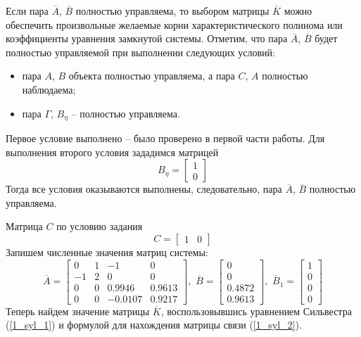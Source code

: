 Если пара $\overline{A}$, $\overline{B}$ полностью управляема, то выбором матрицы $\overline{K}$ можно обеспечить произвольные желаемые корни характеристического полинома или коэффициенты уравнения замкнутой системы. Отметим, что пара $\overline{A}$, $\overline{B}$ будет полностью управляемой при выполнении следующих условий:
\begin{itemize}
	\item пара $A$, $B$ объекта полностью управляема, а пара $C$, $A$ полностью наблюдаема;
	\item пара $\Gamma$, $B_\eta$ -- полностью управляема.
\end{itemize}
Первое условие выполнено -- было проверено в первой части работы. Для выполнения второго условия зададимся матрицей 
\begin{equation}
B_\eta = \begin{bmatrix}
	1\\0
\end{bmatrix}
\end{equation}
Тогда все условия оказываются выполнены, следовательно, пара $\overline{A}$, $\overline{B}$ полностью управляема.

Матрица $C$ по условию задания 
\begin{equation}
	C = \begin{bmatrix}
		1 & 0
	\end{bmatrix}
\end{equation}
Запишем численные значения матриц системы:
\begin{equation}
	\overline{A} = \begin{bmatrix}
0&	1&	-1&	0\\
-1 &	2 &	0&	0\\
0 &	0 &	0.9946 &	0.9613\\
0 &	0 &	-0.0107 &	0.9217
	\end{bmatrix}, \, \,
	\overline{B} = \begin{bmatrix}
		0\\0\\
		0.4872\\
		0.9613
	\end{bmatrix}, \, \, 
	\overline{B}_1 = \begin{bmatrix}
		1 \\ 0\\0 \\ 0
	\end{bmatrix}
\end{equation}
Теперь найдем значение матрицы $\overline{K}$, воспользовывшись уравнением Сильвестра (\ref{1_syl_1}) и формулой для нахождения матрицы связи (\ref{1_syl_2}).

